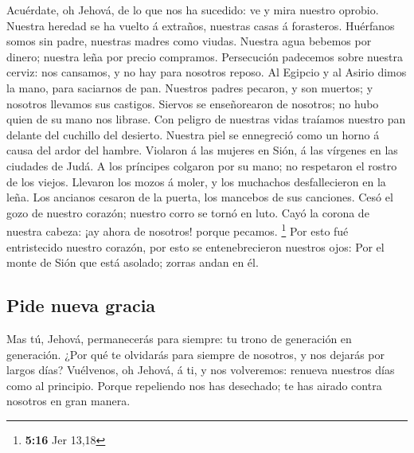  Acuérdate, oh Jehová, de lo que nos ha sucedido: ve y mira
nuestro oprobio.  Nuestra heredad se ha vuelto á extraños,
nuestras casas á forasteros.  Huérfanos somos sin padre,
nuestras madres como viudas.  Nuestra agua bebemos por
dinero; nuestra leña por precio compramos.  Persecución
padecemos sobre nuestra cerviz: nos cansamos, y no hay para nosotros
reposo.  Al Egipcio y al Asirio dimos la mano, para
saciarnos de pan.  Nuestros padres pecaron, y son muertos; y
nosotros llevamos sus castigos.  Siervos se enseñorearon de
nosotros; no hubo quien de su mano nos librase.  Con peligro
de nuestras vidas traíamos nuestro pan delante del cuchillo del
desierto.  Nuestra piel se ennegreció como un horno á causa
del ardor del hambre.  Violaron á las mujeres en Sión, á
las vírgenes en las ciudades de Judá.  A los príncipes
colgaron por su mano; no respetaron el rostro de los viejos.
 Llevaron los mozos á moler, y los muchachos desfallecieron
en la leña.  Los ancianos cesaron de la puerta, los
mancebos de sus canciones.  Cesó el gozo de nuestro
corazón; nuestro corro se tornó en luto.  Cayó la corona de
nuestra cabeza: ¡ay ahora de nosotros! porque pecamos. \footnote{\textbf{5:16}
  Jer 13,18}  Por esto fué entristecido nuestro corazón,
por esto se entenebrecieron nuestros ojos:  Por el monte de
Sión que está asolado; zorras andan en él.

\hypertarget{pide-nueva-gracia}{%
\subsection{Pide nueva gracia}\label{pide-nueva-gracia}}

 Mas tú, Jehová, permanecerás para siempre: tu trono de
generación en generación.  ¿Por qué te olvidarás para
siempre de nosotros, y nos dejarás por largos días? 
Vuélvenos, oh Jehová, á ti, y nos volveremos: renueva nuestros días como
al principio.  Porque repeliendo nos has desechado; te has
airado contra nosotros en gran manera.
